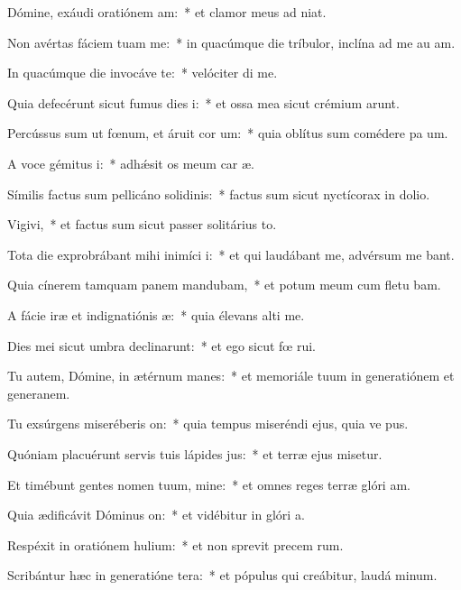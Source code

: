 \item Dómine, exáudi oratiónem am:~* et clamor meus ad  niat.
\item Non avértas fáciem tuam  me:~* in quacúmque die tríbulor, inclína ad me au am.
\item In quacúmque die invocáve te:~* velóciter di me.
\item Quia defecérunt sicut fumus dies i:~* et ossa mea sicut crémium arunt.
\item Percússus sum ut fœnum, et áruit cor um:~* quia oblítus sum comédere pa um.
\item A voce gémitus i:~* adhǽsit os meum car æ.
\item Símilis factus sum pellicáno solidinis:~* factus sum sicut nyctícorax in dolio.
\item Vigivi,~* et factus sum sicut passer solitárius  to.
\item Tota die exprobrábant mihi inimíci i:~* et qui laudábant me, advérsum me bant.
\item Quia cínerem tamquam panem mandubam,~* et potum meum cum fletu bam.
\item A fácie iræ et indignatiónis æ:~* quia élevans alti me.
\item Dies mei sicut umbra declinarunt:~* et ego sicut fœ rui.
\item Tu autem, Dómine, in ætérnum manes:~* et memoriále tuum in generatiónem et generanem.
\item Tu exsúrgens miseréberis on:~* quia tempus miseréndi ejus, quia ve pus.
\item Quóniam placuérunt servis tuis lápides jus:~* et terræ ejus misetur.
\item Et timébunt gentes nomen tuum, mine:~* et omnes reges terræ glóri am.
\item Quia ædificávit Dóminus on:~* et vidébitur in glóri a.
\item Respéxit in oratiónem hulium:~* et non sprevit precem rum.
\item Scribántur hæc in generatióne tera:~* et pópulus qui creábitur, laudá minum.
